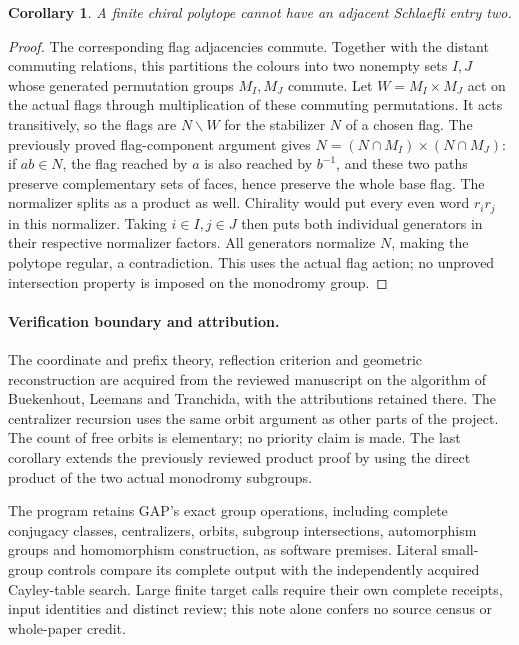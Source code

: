 \documentclass[11pt,a4paper]{article}
\newtheorem{corollary}[proposition]{Corollary}
\begin{document}
\begin{corollary}
A finite chiral polytope cannot have an adjacent Schlaefli entry two.
\end{corollary}
\begin{proof}
The corresponding flag adjacencies commute. Together with the distant
commuting relations, this partitions the colours into two nonempty
sets $I,J$ whose generated permutation groups $M_I,M_J$ commute.
Let $W=M_I\times M_J$ act on the actual flags through multiplication
of these commuting permutations. It acts transitively, so the flags
are $N\backslash W$ for the stabilizer $N$ of a chosen flag.
The previously proved flag-component argument gives
$N=(N\cap M_I)\times(N\cap M_J)$: if $ab\in N$, the flag reached
by $a$ is also reached by $b^{-1}$, and these two paths preserve
complementary sets of faces, hence preserve the whole base flag.
The normalizer splits as a product as well. Chirality would put every
even word $r_ir_j$ in this normalizer. Taking $i\in I,j\in J$ then
puts both individual generators in their respective normalizer
factors. All generators normalize $N$, making the polytope regular,
a contradiction. This uses the actual flag action; no unproved
intersection property is imposed on the monodromy group.
\end{proof}

\paragraph{Verification boundary and attribution.}
The coordinate and prefix theory, reflection criterion and geometric
reconstruction are acquired from the reviewed manuscript on the
algorithm of Buekenhout, Leemans and Tranchida, with the attributions retained
there. The centralizer recursion uses the same orbit argument
as other parts of the project. The count of free orbits is elementary;
no priority claim is made. The last corollary extends the previously
reviewed product proof by using the direct product of the two actual
monodromy subgroups.

The program retains GAP's exact group operations, including complete
conjugacy classes, centralizers, orbits, subgroup intersections,
automorphism groups and homomorphism construction, as software premises.
Literal small-group controls compare its complete output with the
independently acquired Cayley-table search. Large finite target calls
require their own complete receipts, input identities and distinct
review; this note alone confers no source census or whole-paper credit.
\end{document}
